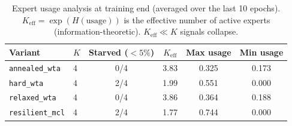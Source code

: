 \begin{table}[t]
\centering
\caption{Expert usage analysis at training end (averaged over the last 10 epochs). $K_{\text{eff}} = \exp(H(\text{usage}))$ is the effective number of active experts (information-theoretic). $K_{\text{eff}} \ll K$ signals collapse.}
\label{tab:expert_collapse}
\small
\begin{tabular}{llcccc}
\toprule
\textbf{Variant} & $K$ & \textbf{Starved} ($<5\%$) & $K_{\text{eff}}$ & \textbf{Max usage} & \textbf{Min usage} \\
\midrule
\texttt{annealed\_wta} & 4 & 0/4 & 3.83 & 0.325 & 0.173 \\
\midrule
\texttt{hard\_wta} & 4 & 2/4 & 1.99 & 0.551 & 0.000 \\
\midrule
\texttt{relaxed\_wta} & 4 & 0/4 & 3.86 & 0.364 & 0.188 \\
\midrule
\texttt{resilient\_mcl} & 4 & 2/4 & 1.77 & 0.744 & 0.000 \\
\bottomrule
\end{tabular}
\end{table}
